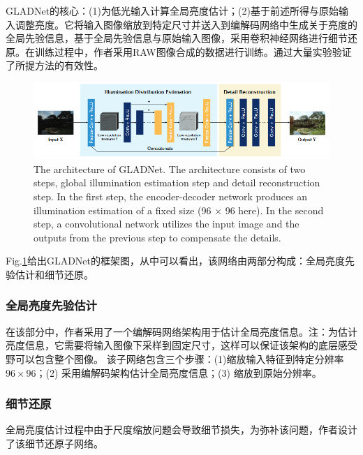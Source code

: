\documentclass[letterpaper,12pt]{article}
\begin{document}
	GLADNet\cite{GLADNet}的核心：(1)为低光输入计算全局亮度估计；(2)基于前述所得与原始输入调整亮度。它将输入图像缩放到特定尺寸并送入到编解码网络中生成关于亮度的全局先验信息，基于全局先验信息与原始输入图像，采用卷积神经网络进行细节还原。在训练过程中，作者采用RAW图像合成的数据进行训练。通过大量实验验证了所提方法的有效性。
	
	\begin{figure}[ht] 
		\centering \includegraphics[width=0.8\columnwidth]{GLADNet}
		\caption{
			\label{fig:GLADNet} %
			The architecture of GLADNet. The architecture consists of two steps, global illumination estimation step and detail reconstruction step. In the first step, the encoder-decoder network produces an illumination estimation of a fixed size (96 × 96 here). In the second step, a convolutional network utilizes the input image and the outputs from the previous step to compensate the details.
		}
	\end{figure}
	
 	Fig.\ref{fig:GLADNet}给出GLADNet的框架图，从中可以看出，该网络由两部分构成：全局亮度先验估计和细节还原。
	
	\subsubsection{全局亮度先验估计}
	
	在该部分中，作者采用了一个编解码网络架构用于估计全局亮度信息。注：为估计亮度信息，它需要将输入图像下采样到固定尺寸，这样可以保证该架构的底层感受野可以包含整个图像。
	该子网络包含三个步骤：(1)缩放输入特征到特定分辨率$96\times96$；(2) 采用编解码架构估计全局亮度信息；(3) 缩放到原始分辨率。
	
	\subsubsection{细节还原}	
	
	全局亮度估计过程中由于尺度缩放问题会导致细节损失，为弥补该问题，作者设计了该细节还原子网络。
	
\end{document}

